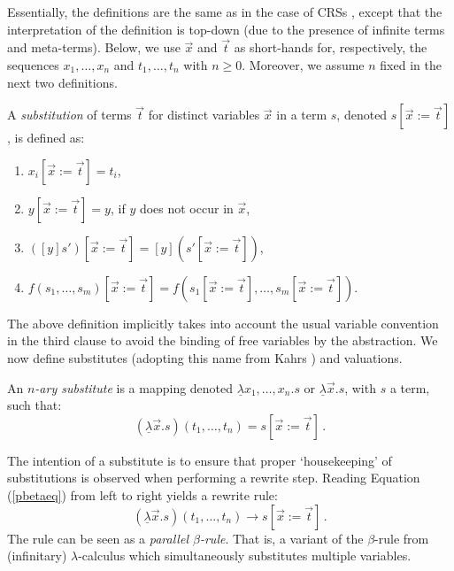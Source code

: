 \documentclass{LMCS}
\theoremstyle{plain}
\theoremstyle{definition}
\newcommand{\rew}{\rightarrow}
\newcommand{\ulam}{\underline{\lambda}}
\begin{document}
Essentially, the definitions are the same as in the case of CRSs \cite{KOR93,T03_R}, except that the interpretation of the definition is top-down (due to the presence of infinite terms and meta-terms). Below, we use $\vec{x}$ and $\vec{t}$ as short-hands for, respectively, the sequences $x_1, \ldots, x_n$ and $t_1, \ldots, t_n$ with $n \geq 0$. Moreover, we assume $n$ fixed in the next two definitions.
\begin{defi}
\label{defsubstitution}
A \emph{substitution} of terms 
$\vec{t}$ for distinct variables 
$\vec{x}$ in a term $s$, denoted $s[\vec{x} := \vec{t}]$, is defined as:
\begin{enumerate}[(1)]
\item
$x_i[\vec{x} := \vec{t}] = t_i$,
\item
$y[\vec{x} := \vec{t}] = y$, if $y$ does not occur in $\vec{x}$,
\item
$([y]s')[\vec{x} := \vec{t}] = [y](s'[\vec{x} := \vec{t}])$,
\item
$f(s_1, \ldots, s_m)[\vec{x} := \vec{t}] = f(s_1[\vec{x} := \vec{t}],
\ldots, s_m[\vec{x} := \vec{t}])$.
\end{enumerate}
\end{defi}
\noindent The above definition implicitly takes into account the usual variable
convention \cite{B85} in the third clause to avoid the binding of free
variables by the abstraction. We now define substitutes (adopting this
name from Kahrs \cite{K93}) and valuations.

\begin{defi}
\label{defsubstitute}
An \emph{$n$-ary substitute} is a mapping denoted $\ulam x_1, \ldots, x_n . s$ or $\ulam \vec{x} . s$, with $s$ a term, such that:
\begin{equation}
\label{pbetaeq}
(\ulam \vec{x} . s)(t_1, \ldots, t_n) = s[\vec{x} := \vec{t}] \, .
\end{equation}
\end{defi}

The intention of a substitute is to ensure that proper `housekeeping' 
of substitutions is observed when performing a rewrite step. Reading Equation (\ref{pbetaeq}) from left to right yields a rewrite rule:
\[
(\ulam \vec{x}. s)(t_1, \ldots, t_n) \rew s[\vec{x} := \vec{t}] \, .
\]
The rule can be seen as a \emph{parallel $\beta$-rule}. That is, a variant of the $\beta$-rule from (infinitary) $\lambda$-calculus which simultaneously substitutes multiple variables.
\end{document}
